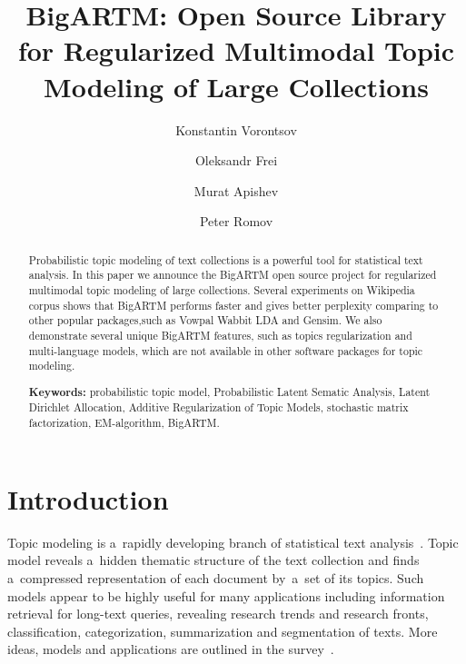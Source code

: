 \documentclass[russian]{llncs}
\begin{document}
\title{
    BigARTM: Open Source Library for
    Regularized Multimodal %
    Topic Modeling of Large Collections
}
\author{
    Konstantin Vorontsov
    \and
    Oleksandr Frei
    \and
    Murat Apishev
    \and
    Peter Romov
}

\maketitle

\begin{abstract}
Probabilistic topic modeling of text collections is a powerful tool for statistical text analysis.
In this paper we announce the BigARTM open source project for regularized multimodal topic modeling of large collections.
Several experiments on Wikipedia corpus shows that BigARTM performs faster and gives better perplexity
comparing to other popular packages,such as Vowpal Wabbit LDA and Gensim.
We also demonstrate several unique BigARTM features, such as topics regularization and multi-language models,
which are not available in other software packages for topic modeling.

\vspace{1em}
\textbf{Keywords:}
    probabilistic topic model,
    Probabilistic Latent Sematic Analysis,
    Latent Dirichlet Allocation,
    Additive Regularization of Topic Models,
    stochastic matrix factorization,
    EM-algorithm,
    BigARTM.
\end{abstract}

\section{Introduction}

Topic modeling is a~rapidly developing branch of statistical text analysis~\cite{blei12ptm}.
Topic model reveals a~hidden thematic structure of the text collection
and finds a~compressed representation of each document by~a~set of its topics.
Such models appear to be highly useful for many applications including
information retrieval for long-text queries,
revealing research trends and research fronts,
classification, categorization, summarization and segmentation of texts.
More ideas, models and applications are outlined in the survey~\cite{daud10knowledge}.
\end{document}
